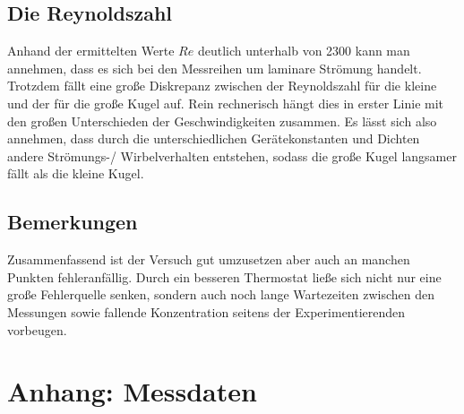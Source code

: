 \subsection[]{Die Reynoldszahl}
Anhand der ermittelten Werte $Re$ deutlich unterhalb von 2300 kann man annehmen, dass es sich bei den Messreihen um laminare Strömung handelt.
Trotzdem fällt eine große Diskrepanz zwischen der Reynoldszahl für die kleine und der für die große Kugel auf.
Rein rechnerisch hängt dies in erster Linie mit den großen Unterschieden der Geschwindigkeiten zusammen.
Es lässt sich also annehmen, dass durch die unterschiedlichen Gerätekonstanten und Dichten andere Strömungs-/ Wirbelverhalten entstehen, sodass 
die große Kugel langsamer fällt als die kleine Kugel.

\subsection[]{Bemerkungen}
Zusammenfassend ist der Versuch gut umzusetzen aber auch an manchen Punkten fehleranfällig.
Durch ein besseren Thermostat ließe sich nicht nur eine große Fehlerquelle senken,
sondern auch noch lange Wartezeiten zwischen den Messungen sowie fallende Konzentration seitens der Experimentierenden vorbeugen.



\section*{Anhang: Messdaten}

\printbibliography

